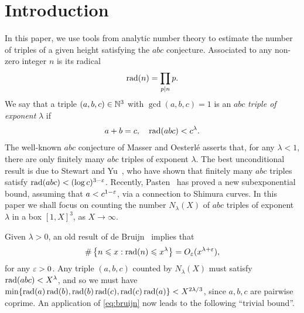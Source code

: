 %

\chapter{Introduction}

In this paper, we use tools from analytic number theory to estimate the number of triples of a given height satisfying the $abc$ conjecture.
Associated to any non-zero  integer $n$ is its radical
\begin{align*}
\operatorname{rad}(n)=\prod_{p\mid n}p.
\end{align*}
We say that a triple $(a,b,c)\in \mathbb{N}^3$
with $\gcd(a,b,c)=1$ is
 an $abc$ \emph{triple of exponent} $\lambda$ if
\begin{align*}
a+b=c,\quad \operatorname{rad}(abc) < c^{\lambda}.
\end{align*}
The well-known $abc$ conjecture of Masser and Oesterl\'e asserts that, for any $\lambda<1$, there are only finitely many $abc$ triples of exponent $\lambda$.
The   best unconditional result is  due to Stewart and Yu~\cite{styu}, who  have shown that  finitely many $abc$ triples satisfy $\operatorname{rad}(abc) < (\log c)^{3-\varepsilon}$. Recently, Pasten~\cite{hector} has proved a new subexponential bound, assuming that  $a<c^{1-\varepsilon}$, via a connection to Shimura curves.
In this paper we shall focus on counting the number $N_\lambda(X)$ of $abc$ triples of exponent $\lambda$ in a box $[1,X]^3$, as $X\to \infty$.

Given $\lambda>0$,
an old result of
de Bruijn~\cite{debruijn} implies that
\begin{equation}\label{eq:bruijn}
\#\left\{n\leqslant x : \operatorname{rad}(n)\leqslant x^\lambda\right\}=O_\varepsilon(x^{\lambda+\varepsilon}),
\end{equation}
for any $\varepsilon>0$. Any triple $(a,b,c)$ counted by
$N_\lambda(X)$ must satisfy $\operatorname{rad}(abc)< X^{\lambda}$, and so
we must have
$\min\{\operatorname{rad}(a)\operatorname{rad}(b),\operatorname{rad}(b)\operatorname{rad}(c),\operatorname{rad}(c)\operatorname{rad}(a)\}< X^{2\lambda/3}$, since $a,b,c$ are pairwise coprime.
An application of \eqref{eq:bruijn} now leads to the following ``trivial bound''.

